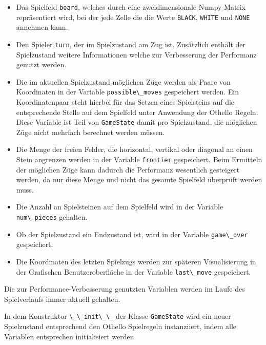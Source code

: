 \begin{itemize}
\tightlist
\item
  Das Spielfeld \passthrough{\lstinline!board!}, welches durch eine
  zweidimensionale Numpy-Matrix repräsentiert wird, bei der jede Zelle
  die die Werte \passthrough{\lstinline!BLACK!},
  \passthrough{\lstinline!WHITE!} und \passthrough{\lstinline!NONE!}
  annehmen kann.
\item
  Den Spieler \passthrough{\lstinline!turn!}, der im Spielzustand am Zug
  ist. Zusätzlich enthält der Spielzustand weitere Informationen welche
  zur Verbesserung der Performanz genutzt werden.
\item
  Die im aktuellen Spielzustand möglichen Züge werden als Paare von
  Koordinaten in der Variable \passthrough{\lstinline!possible\_moves!}
  gespeichert werden. Ein Koordinatenpaar steht hierbei für das Setzen
  eines Spielsteins auf die entsprechende Stelle auf dem Spielfeld unter
  Anwendung der Othello Regeln. Diese Variable ist Teil von
  \passthrough{\lstinline!GameState!} damit pro Spielzustand, die
  möglichen Züge nicht mehrfach berechnet werden müssen.
\item
  Die Menge der freien Felder, die horizontal, vertikal oder diagonal an
  einen Stein angrenzen werden in der Variable
  \passthrough{\lstinline!frontier!} gespeichert. Beim Ermitteln der
  möglichen Züge kann dadurch die Performanz wesentlich gesteigert
  werden, da nur diese Menge und nicht das gesamte Spielfeld überprüft
  werden muss.
\item
  Die Anzahl an Spielsteinen auf dem Spielfeld wird in der Variable
  \passthrough{\lstinline!num\_pieces!} gehalten.
\item
  Ob der Spielzustand ein Endzustand ist, wird in der Variable
  \passthrough{\lstinline!game\_over!} gespeichert.
\item
  Die Koordinaten des letzten Spielzugs werden zur späteren
  Visualisierung in der Grafischen Benutzeroberfläche in der Variable
  \passthrough{\lstinline!last\_move!} gespeichert.
\end{itemize}

Die zur Performance-Verbesserung genutzten Variablen werden im Laufe des
Spielverlaufs immer aktuell gehalten.

In dem Konstruktor \passthrough{\lstinline!\_\_init\_\_!} der Klasse
\passthrough{\lstinline!GameState!} wird ein neuer Spielzustand
entsprechend den Othello Spielregeln instanziiert, indem alle Variablen
entsprechen initialisiert werden.

